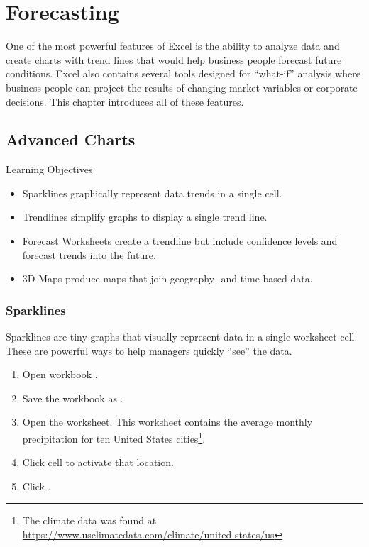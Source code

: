 \chapter{Forecasting}\label{ch08:forecasting}

One of the most powerful features of Excel is the ability to analyze data and create charts with trend lines that would help business people forecast future conditions. Excel also contains several tools designed for ``what-if'' analysis where business people can project the results of changing market variables or corporate decisions. This chapter introduces all of these features. 

\section{Advanced Charts}

\begin{center}
	\begin{objbox}{Learning Objectives}
		\begin{itemize}
			\setlength{\itemsep}{0pt}
			\setlength{\parskip}{0pt}
			\setlength{\parsep}{0pt}
			
			\item Sparklines graphically represent data trends in a single cell.
			\item Trendlines simplify graphs to display a single trend line.
			\item Forecast Worksheets create a trendline but include confidence levels and forecast trends into the future.
			\item $ 3 $D Maps produce maps that join geography- and time-based data.

		\end{itemize}
	\end{objbox}
\end{center}

\subsection{Sparklines}

Sparklines are tiny graphs that visually represent data in a single worksheet cell. These are powerful ways to help managers quickly ``see'' the data.

\begin{enumerate}
	\item Open workbook .
	\item Save the workbook as .
	\item Open the  worksheet. This worksheet contains the average monthly precipitation for ten United States cities\footnote{The climate data was found at \url{https://www.usclimatedata.com/climate/united-states/us}}.
	\item Click cell  to activate that location.
	\item Click .
\end{enumerate}

